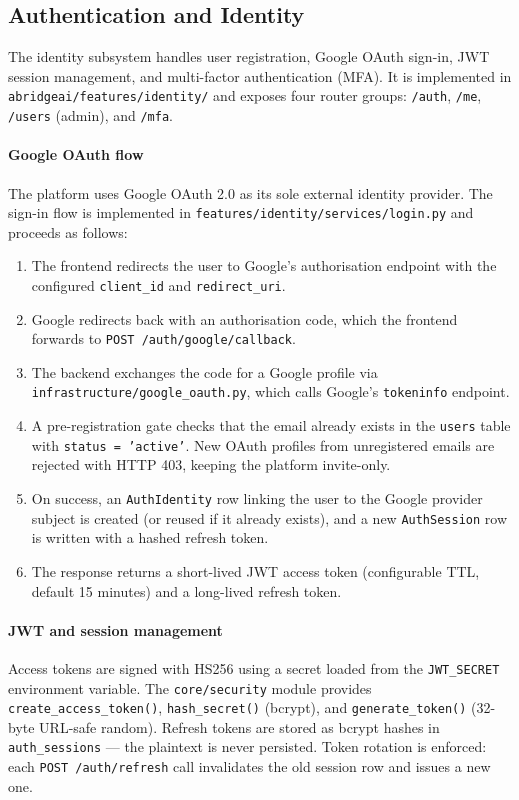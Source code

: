 \subsection{Authentication and Identity}
\label{sec:impl_auth}

The identity subsystem handles user registration, Google OAuth sign-in, JWT session management, and multi-factor authentication (MFA). It is implemented in \texttt{abridgeai/features/identity/} and exposes four router groups: \texttt{/auth}, \texttt{/me}, \texttt{/users} (admin), and \texttt{/mfa}.

\paragraph{Google OAuth flow}
The platform uses Google OAuth 2.0 as its sole external identity provider. The sign-in flow is implemented in \texttt{features/identity/services/login.py} and proceeds as follows:

\begin{enumerate}
    \item The frontend redirects the user to Google's authorisation endpoint with the configured \texttt{client\_id} and \texttt{redirect\_uri}.
    \item Google redirects back with an authorisation code, which the frontend forwards to \texttt{POST /auth/google/callback}.
    \item The backend exchanges the code for a Google profile via \texttt{infrastructure/google\_oauth.py}, which calls Google's \texttt{tokeninfo} endpoint.
    \item A pre-registration gate checks that the email already exists in the \texttt{users} table with \texttt{status = 'active'}. New OAuth profiles from unregistered emails are rejected with HTTP 403, keeping the platform invite-only.
    \item On success, an \texttt{AuthIdentity} row linking the user to the Google provider subject is created (or reused if it already exists), and a new \texttt{AuthSession} row is written with a hashed refresh token.
    \item The response returns a short-lived JWT access token (configurable TTL, default 15 minutes) and a long-lived refresh token.
\end{enumerate}

\paragraph{JWT and session management}
Access tokens are signed with HS256 using a secret loaded from the \texttt{JWT\_SECRET} environment variable. The \texttt{core/security} module provides \texttt{create\_access\_token()}, \texttt{hash\_secret()} (bcrypt), and \texttt{generate\_token()} (32-byte URL-safe random). Refresh tokens are stored as bcrypt hashes in \texttt{auth\_sessions} — the plaintext is never persisted. Token rotation is enforced: each \texttt{POST /auth/refresh} call invalidates the old session row and issues a new one.

